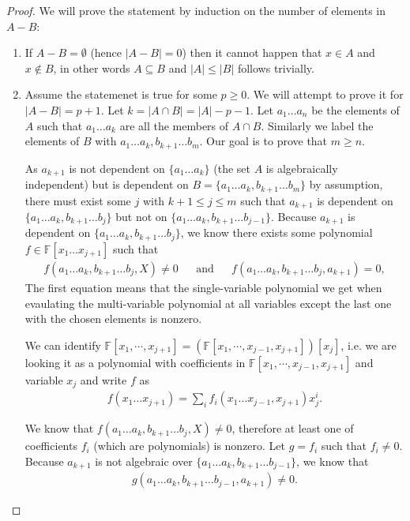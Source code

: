 \begin{proof}
	We will prove the statement by induction on the number of elements in $A - B$:
	\begin{enumerate}
		\item  If $A - B = \emptyset $ (hence $|A -B| = 0$) then it cannot happen that $x\in A$ and $x\notin B$, in other words $A \subseteq B$ and $|A| \leq |B|$ follows trivially.
		\item  Assume the statemenet is true for some $p\geq 0 $. We will attempt to prove it for $|A - B| = p + 1$. Let $k = |A \cap B| = |A| - p - 1$. Let $a _1 \ldots a _n$ be the elements of $A$ such that $a _1 \ldots a_k$ are all the members of $A \cap B$. Similarly we label the elements of $B$ with $ a _1 \ldots a_k, b _{k + 1} \ldots b _m$. Our goal is to prove that $m \geq n$.

		      As $a _{k + 1}$ is not dependent on $\{a _1 \ldots a_k\}$ (the set $A$ is algebraically independent) but is dependent on $B = \{a _1 \ldots a _k, b _{k + 1} \ldots b_m\}$ by assumption, there must exist some $j$ with $k + 1 \leq j \leq m$ such that $a _{k + 1}$ is dependent on $\{a _1 \ldots a _k, b _{k + 1} \ldots b_j\}$ but  not on $\{a _1 \ldots a _k, b _{k + 1} \ldots b _{j - 1}\}$. Because $a _{k + 1}$ is dependent on $\{a _1 \ldots a _k, b _{k + 1} \ldots b_j\}$, we know there exists some polynomial $f \in \mathbb F[x _1 \ldots x _{j + 1}]$ such that
		      \begin{align*}
			      f(a _1 \ldots a _{k}, b _{k + 1} \ldots b _{j}, X) \neq  0 &&\text{and}&&
			      f(a _1 \ldots a _{k}, b _{k + 1} \ldots b _{j}, a _{k + 1})  = 0,
		      \end{align*}
        The first equation means that the single-variable polynomial we get when evaulating the multi-variable polynomial at all variables except the last one with the chosen elements is nonzero. 

		      We can identify $\mathbb{F}[x_1,\cdots,x_{j+1}] = (\mathbb{F}[x_1,\cdots, x_{j-1}, x_{j+1}])[x_j]$, i.e. we are looking it as a polynomial with coefficients in  $\mathbb{F}[x_1,\cdots, x_{j-1}, x_{j+1}]$ and variable $x_j$ and write $f$ as
		      \begin{align*}
			      f(x _1 \ldots x _{j + 1})
			      = \sum_i f _i(x _1 \ldots x _{j - 1}, x _{j + 1}) x _j ^i.
		      \end{align*}

		      We know that $f(a _1 \ldots a _{k}, b _{k + 1} \ldots b _{j}, X) \neq  0$, therefore at least one of coefficients $f _i $ (which are polynomials) is nonzero. Let $g = f _i $ such that $f _i \neq 0$. Because $a _{k + 1}$ is not algebraic over $\{a _1 \ldots a _k, b _{k + 1} \ldots b _{j - 1}\}$, we know that
		      \begin{align*}
			      g(a _1 \ldots a _k, b _{k + 1} \ldots b _{j - 1}, a _{k + 1}) \neq 0.
		      \end{align*}


\end{enumerate}
\end{proof}
